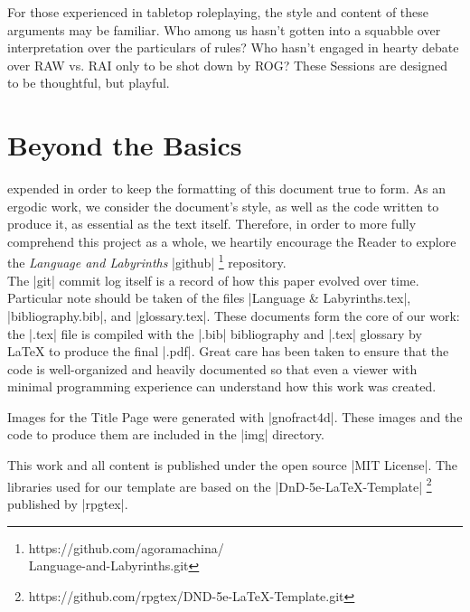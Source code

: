 \documentclass[10pt,twoside,twocolumn,openany,nomultitoc]{book}
\begin{document}
For those experienced in tabletop roleplaying, the style and content of these arguments may be familiar. Who among us hasn't gotten into a squabble over interpretation over the particulars of rules? Who hasn't engaged in hearty debate over RAW vs. RAI only to be shot down by ROG? These Sessions are designed to be thoughtful, but playful. 

 \vspace{10pt} 
 \section{Beyond the Basics}\vspace{2pt}
  expended in order to keep the formatting of this document true to form. As an ergodic work, we consider the document's style, as well as the code written to produce it, as essential as the text itself. Therefore, in order to more fully comprehend this project as a whole, we heartily encourage the Reader to explore the \textit{Language and Labyrinths} |github|%
    \footnote{https://github.com/agoramachina/\\\hspace{6pt}Language-and-Labyrinths.git} repository. \\

The |git| commit log itself is a record of how this paper evolved over time.  Particular note should be taken of the files |Language & Labyrinths.tex|, |bibliography.bib|, and |glossary.tex|. These documents form the core of our work: the |.tex| file is compiled with the |.bib| bibliography and |.tex| glossary by \LaTeX\vspace{1pt} to produce the final |.pdf|. Great care has been taken to ensure that the code is well-organized and heavily documented so that even a viewer with minimal programming experience can understand how this work was created. \\\vspace{12pt}

Images for the Title Page were generated with |gnofract4d|. These images and the code to produce them are included in the |img| directory. 

This work and all content is published under the open source |MIT License|. The libraries used for our template are based on the |DnD-5e-LaTeX-Template|%
    \footnote{https://github.com/rpgtex/DND-5e-LaTeX-Template.git} published by |rpgtex|. 
\end{document}
